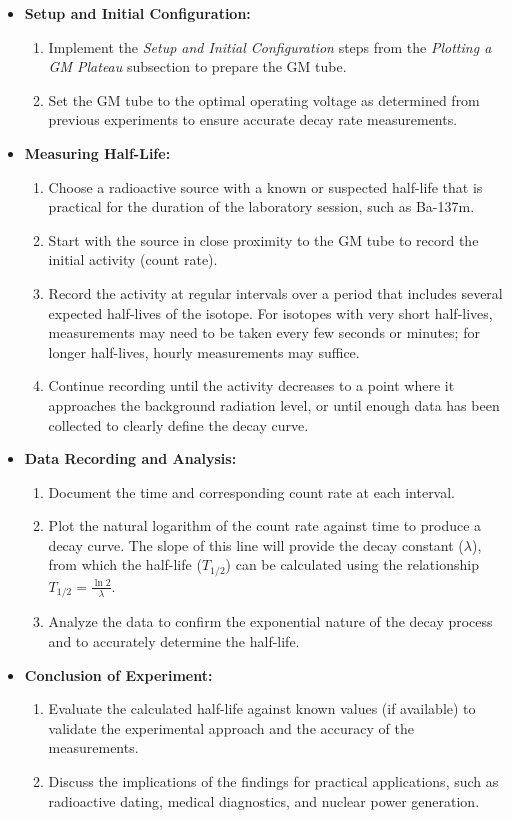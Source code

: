 \documentclass[11pt]{article}
\begin{document}
	\begin{itemize}
		\item \textbf{Setup and Initial Configuration:}
		\begin{enumerate}
			\item Implement the \textit{Setup and Initial Configuration} steps from the \textit{Plotting a GM Plateau} subsection to prepare the GM tube.
			\item Set the GM tube to the optimal operating voltage as determined from previous experiments to ensure accurate decay rate measurements.
		\end{enumerate}
		
		\item \textbf{Measuring Half-Life:}
		\begin{enumerate}
			\item Choose a radioactive source with a known or suspected half-life that is practical for the duration of the laboratory session, such as Ba-137m.
			\item Start with the source in close proximity to the GM tube to record the initial activity (count rate).
			\item Record the activity at regular intervals over a period that includes several expected half-lives of the isotope. For isotopes with very short half-lives, measurements may need to be taken every few seconds or minutes; for longer half-lives, hourly measurements may suffice.
			\item Continue recording until the activity decreases to a point where it approaches the background radiation level, or until enough data has been collected to clearly define the decay curve.
		\end{enumerate}
		
		\item \textbf{Data Recording and Analysis:}
		\begin{enumerate}
			\item Document the time and corresponding count rate at each interval.
			\item Plot the natural logarithm of the count rate against time to produce a decay curve. The slope of this line will provide the decay constant (\(\lambda\)), from which the half-life (\(T_{1/2}\)) can be calculated using the relationship \(T_{1/2} = \frac{\ln 2}{\lambda}\).
			\item Analyze the data to confirm the exponential nature of the decay process and to accurately determine the half-life.
		\end{enumerate}
		
		\item \textbf{Conclusion of Experiment:}
		\begin{enumerate}
			\item Evaluate the calculated half-life against known values (if available) to validate the experimental approach and the accuracy of the measurements.
			\item Discuss the implications of the findings for practical applications, such as radioactive dating, medical diagnostics, and nuclear power generation.
		\end{enumerate}
	\end{itemize}
	
\end{document}
